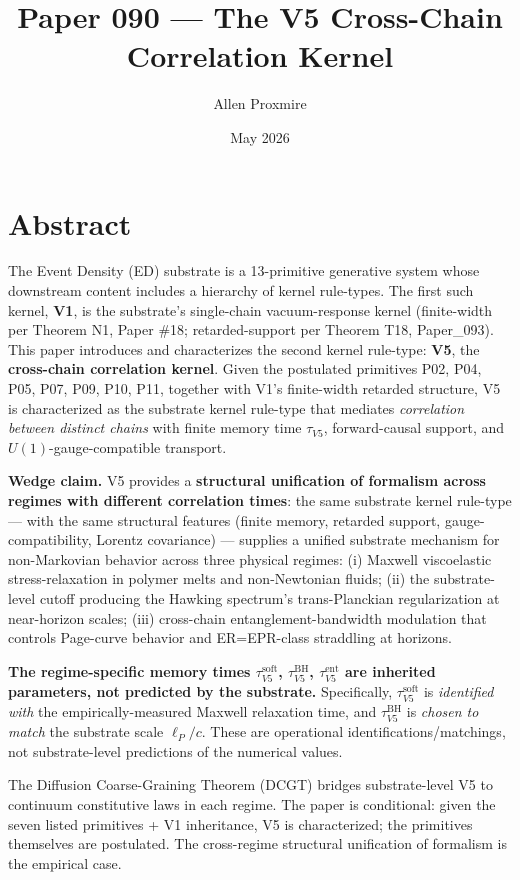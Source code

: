 \documentclass[11pt,a4paper]{article}
\title{\vspace{-1cm}\Large\bfseries Paper 090 --- The V5 Cross-Chain Correlation Kernel}
\author{Allen Proxmire}
\date{May 2026}
\begin{document}
\maketitle

\section*{Abstract}

The Event Density (ED) substrate is a 13-primitive generative system whose downstream content includes a hierarchy of kernel rule-types. The first such kernel, \textbf{V1}, is the substrate's single-chain vacuum-response kernel (finite-width per Theorem N1, Paper \#18; retarded-support per Theorem T18, Paper\_093). This paper introduces and characterizes the second kernel rule-type: \textbf{V5}, the \textbf{cross-chain correlation kernel}. Given the postulated primitives P02, P04, P05, P07, P09, P10, P11, together with V1's finite-width retarded structure, V5 is characterized as the substrate kernel rule-type that mediates \emph{correlation between distinct chains} with finite memory time $\tau_{V5}$, forward-causal support, and $U(1)$-gauge-compatible transport.

\textbf{Wedge claim.} V5 provides a \textbf{structural unification of formalism across regimes with different correlation times}: the same substrate kernel rule-type --- with the same structural features (finite memory, retarded support, gauge-compatibility, Lorentz covariance) --- supplies a unified substrate mechanism for non-Markovian behavior across three physical regimes: (i) Maxwell viscoelastic stress-relaxation in polymer melts and non-Newtonian fluids; (ii) the substrate-level cutoff producing the Hawking spectrum's trans-Planckian regularization at near-horizon scales; (iii) cross-chain entanglement-bandwidth modulation that controls Page-curve behavior and ER=EPR-class straddling at horizons.

\textbf{The regime-specific memory times $\tau_{V5}^\mathrm{soft}$, $\tau_{V5}^\mathrm{BH}$, $\tau_{V5}^\mathrm{ent}$ are inherited parameters, not predicted by the substrate.} Specifically, $\tau_{V5}^\mathrm{soft}$ is \emph{identified with} the empirically-measured Maxwell relaxation time, and $\tau_{V5}^\mathrm{BH}$ is \emph{chosen to match} the substrate scale $\ell_P/c$. These are operational identifications/matchings, not substrate-level predictions of the numerical values.

The Diffusion Coarse-Graining Theorem (DCGT) bridges substrate-level V5 to continuum constitutive laws in each regime. The paper is conditional: given the seven listed primitives + V1 inheritance, V5 is characterized; the primitives themselves are postulated. The cross-regime structural unification of formalism is the empirical case.
\end{document}
